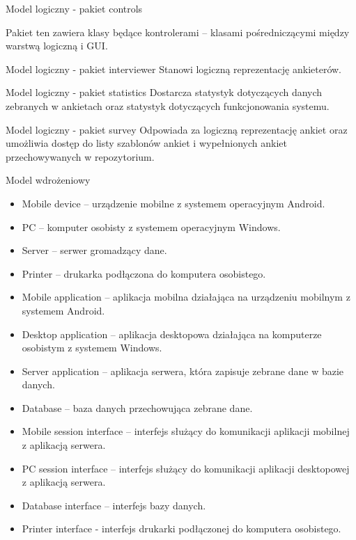 \documentclass[a4paper,10pt]{beamer}
\begin{document}
	\begin{frame}{Model logiczny - pakiet controls}
		
		Pakiet ten zawiera klasy będące kontrolerami – klasami pośredniczącymi między warstwą logiczną i GUI.
	\end{frame}
	
	\begin{frame}{Model logiczny - pakiet interviewer}
		Stanowi logiczną reprezentację ankieterów.
	\end{frame}
	\begin{frame}{Model logiczny - pakiet statistics}
		Dostarcza statystyk dotyczących danych zebranych w ankietach oraz statystyk dotyczących funkcjonowania systemu.
	\end{frame}
	\begin{frame}{Model logiczny - pakiet survey}
		Odpowiada za logiczną reprezentację ankiet oraz umożliwia dostęp do listy szablonów ankiet i wypełnionych ankiet przechowywanych w repozytorium.
	\end{frame}
	
	\begin{frame}{Model wdrożeniowy}
	\end{frame}
	
	\begin{frame}
		\begin{itemize}
			\item Mobile device – urządzenie mobilne z systemem operacyjnym Android.
			\item PC – komputer osobisty z systemem operacyjnym Windows.
			\item Server – serwer gromadzący dane.
			\item Printer – drukarka podłączona do komputera osobistego.
			\item Mobile application – aplikacja mobilna działająca na urządzeniu mobilnym z systemem Android.
			\item Desktop application – aplikacja desktopowa działająca na komputerze osobistym z systemem Windows.
			\item Server application – aplikacja serwera, która zapisuje zebrane dane w bazie danych.
			\item Database – baza danych przechowująca zebrane dane.
			\item Mobile session interface – interfejs służący do komunikacji aplikacji mobilnej z aplikacją serwera.
			\item PC session interface – interfejs służący do komunikacji aplikacji desktopowej z aplikacją serwera.
			\item Database interface – interfejs bazy danych.
			\item Printer interface  - interfejs drukarki podłączonej do komputera osobistego.
		\end{itemize}
	\end{frame}
	
\end{document}
